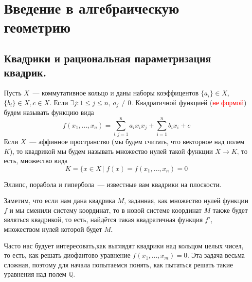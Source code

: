 \documentclass[11pt]{article}
\begin{document}
    \section{Введение в алгебраическую геометрию}
    \subsection{Квадрики и рациональная параметризация квадрик.}
    \begin{definition}
        Пусть $X$~--- коммутативное кольцо и даны наборы коэффицентов $\{ a_i \} \in X$, $\{ b_i \} \in X, c \in X$.
        Если $\exists j\colon 1 \le j \le n, \ a_j \neq 0$.
        Квадратичной функцией (\textcolor{red}{не формой})  будем называть функцию вида
        \[ f(x_1, \ldots, x_n) = \sum\limits_{i, j = 1}^{n} a_{i} x_i x_j + \sum\limits_{i = 1}^{n} b_i x_i + c  \]
        Если $X$~--- аффинное пространство (мы будем считать, что векторное над полем $K$), то квадрикой мы будем называть множество нулей такой функции $X \to K$, то есть, множество вида
        \[ K = \{ x \in X \ | \ f(x) = f(x_1, \ldots, x_n) = 0 \]
    \end{definition}
    \begin{example}
        Эллипс, порабола и гипербола~--- известные вам квадрики на плоскости.
    \end{example}

    \begin{remark}
        Заметим, что если нам дана квадрика $M$, заданная, как множество нулей функции $f$ и мы сменили систему координат, то
        в новой системе координат $M$ также будет являться квадрикой, то есть, найдётся такая квадратичная функция $f'$, множеством нулей которой
        будет $M$.
    \end{remark}
    Часто нас будует интересовать,как выглядят квадрики над кольцом целых чисел, то есть, как решать диофантово уравнение
    $f(x_1, \ldots, x_m) = 0$. Эта задача весьма сложная, поэтому для начала попытаемся понять, как пытаться решать такие уравнения
    над полем $\mathbb{Q}$.
\end{document}
